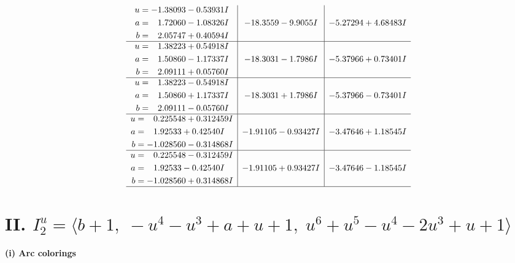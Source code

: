 \documentclass[1p]{elsarticle_modified}
\theoremstyle{definition}
\begin{document}
$$\begin{array}{c|c|c}
\begin{aligned}
u &= -1.38093 - 0.53931 I \\
a &= \phantom{-}1.72060 - 1.08326 I \\
b &= \phantom{-}2.05747 + 0.40594 I\end{aligned}
 & -18.3559 - 9.9055 I & -5.27294 + 4.68483 I \\ \hline\begin{aligned}
u &= \phantom{-}1.38223 + 0.54918 I \\
a &= \phantom{-}1.50860 - 1.17337 I \\
b &= \phantom{-}2.09111 + 0.05760 I\end{aligned}
 & -18.3031 - 1.7986 I & -5.37966 + 0.73401 I \\ \hline\begin{aligned}
u &= \phantom{-}1.38223 - 0.54918 I \\
a &= \phantom{-}1.50860 + 1.17337 I \\
b &= \phantom{-}2.09111 - 0.05760 I\end{aligned}
 & -18.3031 + 1.7986 I & -5.37966 - 0.73401 I \\ \hline\begin{aligned}
u &= \phantom{-}0.225548 + 0.312459 I \\
a &= \phantom{-}1.92533 + 0.42540 I \\
b &= -1.028560 - 0.314868 I\end{aligned}
 & -1.91105 - 0.93427 I & -3.47646 + 1.18545 I \\ \hline\begin{aligned}
u &= \phantom{-}0.225548 - 0.312459 I \\
a &= \phantom{-}1.92533 - 0.42540 I \\
b &= -1.028560 + 0.314868 I\end{aligned}
 & -1.91105 + 0.93427 I & -3.47646 - 1.18545 I\\
 \hline 
 \end{array}$$\newpage\newpage\renewcommand{\arraystretch}{1}
\centering \section*{II. $I^u_{2}= \langle b+1,\;- u^4- u^3+a+u+1,\;u^6+u^5- u^4-2 u^3+u+1 \rangle$}
\flushleft \textbf{(i) Arc colorings}\\
\end{document}
